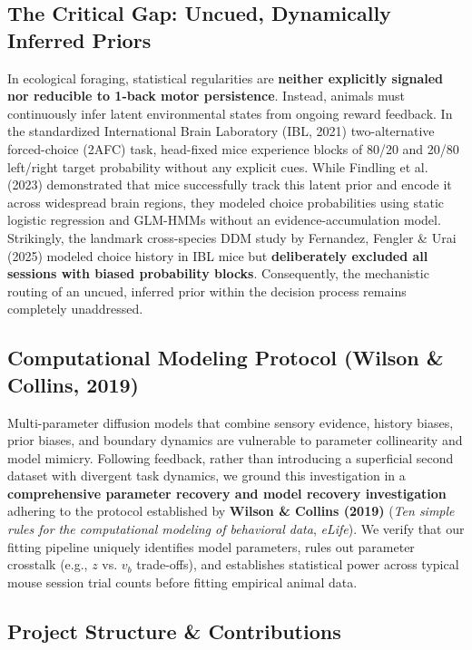 \documentclass[10pt,a4paper]{article}
\begin{document}
\subsection*{The Critical Gap: Uncued, Dynamically Inferred Priors}
In ecological foraging, statistical regularities are \textbf{neither explicitly signaled nor reducible to 1-back motor persistence}. Instead, animals must continuously infer latent environmental states from ongoing reward feedback. In the standardized International Brain Laboratory (IBL, 2021) two-alternative forced-choice (2AFC) task, head-fixed mice experience blocks of 80/20 and 20/80 left/right target probability without any explicit cues. While Findling et al. (2023) demonstrated that mice successfully track this latent prior and encode it across widespread brain regions, they modeled choice probabilities using static logistic regression and GLM-HMMs without an evidence-accumulation model. Strikingly, the landmark cross-species DDM study by Fernandez, Fengler \& Urai (2025) modeled choice history in IBL mice but \textbf{deliberately excluded all sessions with biased probability blocks}. Consequently, the mechanistic routing of an uncued, inferred prior within the decision process remains completely unaddressed.

\subsection*{Computational Modeling Protocol (Wilson \& Collins, 2019)}
Multi-parameter diffusion models that combine sensory evidence, history biases, prior biases, and boundary dynamics are vulnerable to parameter collinearity and model mimicry. Following feedback, rather than introducing a superficial second dataset with divergent task dynamics, we ground this investigation in a \textbf{comprehensive parameter recovery and model recovery investigation} adhering to the protocol established by \textbf{Wilson \& Collins (2019)} (\textit{Ten simple rules for the computational modeling of behavioral data}, \textit{eLife}). We verify that our fitting pipeline uniquely identifies model parameters, rules out parameter crosstalk (e.g., $z$ vs. $v_b$ trade-offs), and establishes statistical power across typical mouse session trial counts before fitting empirical animal data.

\subsection*{Project Structure \& Contributions}
\end{document}
